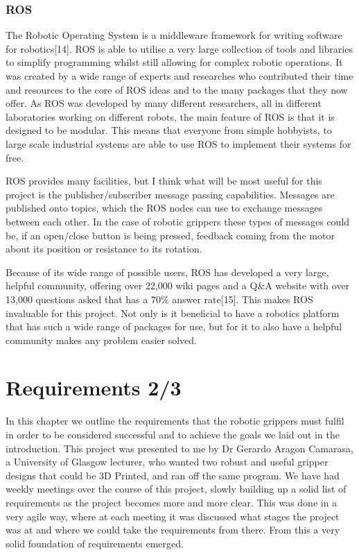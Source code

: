 \documentclass{l4proj}
\begin{document}
\subsection{ROS}
The Robotic Operating System is a middleware framework for writing software for robotics[14]. ROS is able to utilise a very large collection of tools and libraries to simplify programming whilst still allowing for complex robotic operations. It was created by a wide range of experts and researches who contributed their time and resources to the core of ROS ideas and to the many packages that they now offer. As ROS was developed by many different researchers, all in different laboratories working on different robots, the main feature of ROS is that it is designed to be modular. This means that everyone from simple hobbyists, to large scale industrial systems are able to use ROS to implement their systems for free. 

ROS provides many facilities, but I think what will be most useful for this project is the publisher/subscriber message passing capabilities. Messages are published onto topics, which the ROS nodes can use to exchange messages between each other. In the case of robotic grippers these types of messages could be, if an open/close button is being pressed, feedback coming from the motor about its position or resistance to its rotation.

Because of its wide range of possible users, ROS has developed a very large, helpful community, offering over 22,000 wiki pages and a Q\&A website with over 13,000 questions asked that has a 70\% answer rate[15]. This makes ROS invaluable for this project. Not only is it beneficial to have a robotics platform that has such a wide range of packages for use, but for it to also have a helpful community makes any problem easier solved.




\chapter{Requirements 2/3}
In this chapter we outline the requirements that the robotic grippers must fulfil in order to be considered successful and to achieve the goals we laid out in the introduction. This project was presented to me by Dr Gerardo Aragon Camarasa, a University of Glasgow lecturer, who wanted two robust and useful gripper designs that could be 3D Printed, and ran off the same program. We have had weekly meetings over the course of this project, slowly building up a solid list of requirements as the project becomes more and more clear. This was done in a very agile way, where at each meeting it was discussed what stages the project was at and where we could take the requirements from there. From this a very solid foundation of requirements emerged. 
\end{document}
